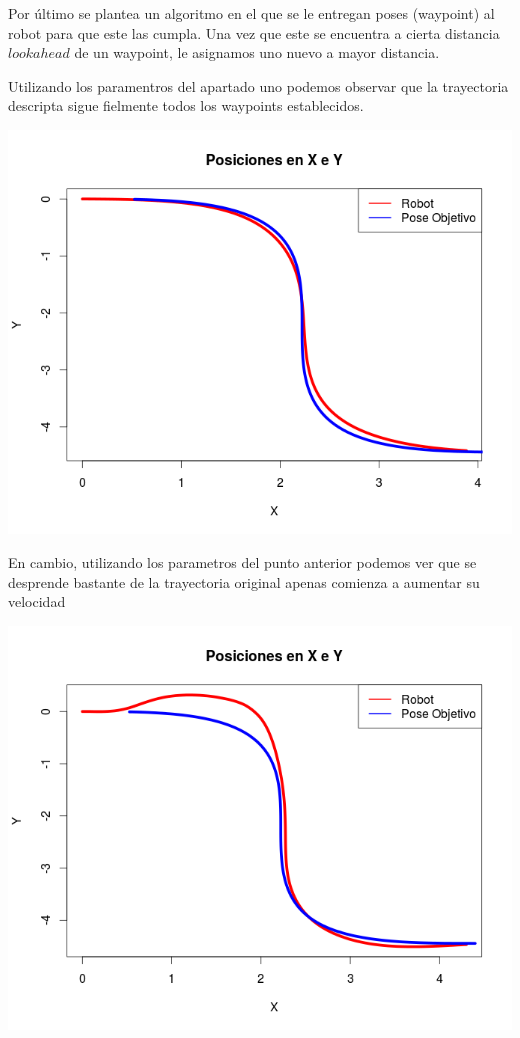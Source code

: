 Por último se plantea un algoritmo en el que se le entregan poses (waypoint) al robot para que este las cumpla. Una vez que este se encuentra a cierta distancia $lookahead$ de un waypoint, le asignamos uno nuevo a mayor distancia.

Utilizando los paramentros del apartado uno podemos observar que la trayectoria descripta sigue fielmente todos los waypoints establecidos.

\begin{center}
\includegraphics[scale=0.55]{ejercicio3c}
\end{center}

En cambio, utilizando los parametros del punto anterior podemos ver que se desprende bastante de la trayectoria original apenas comienza a aumentar su velocidad

\begin{center}
\includegraphics[scale=0.55]{ejercicio3b}
\end{center}


